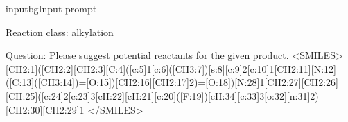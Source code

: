 \begin{appendices}
 

 

 

 

 

 

 

 

 

 

 

 

 

 

 

 

 

 

 

 

 

 

 

 

 

 

 

 

 

 

 

 

 

 
 

 

 

 

 


\label{fig:full-cot-1t4b-a-p0a9q9-bp}

 

\begingroup

\begin{fullcotsection}{inputbg}{Input prompt}

\begin{cotverbatim}

Reaction class: alkylation

Question:
Please suggest potential reactants for the given product.
<SMILES> [CH2:1]([CH2:2][CH2:3][C:4]([c:5]1[c:6]([CH3:7])[s:8][c:9]2[c:10]1[CH2:11][N:12]([C:13]([CH3:14])=[O:15])[CH2:16][CH2:17]2)=[O:18])[N:28]1[CH2:27][CH2:26][CH:25]([c:24]2[c:23]3[cH:22][cH:21][c:20]([F:19])[cH:34][c:33]3[o:32][n:31]2)[CH2:30][CH2:29]1 </SMILES>


\end{cotverbatim}
\end{fullcotsection}
\end{appendices}
